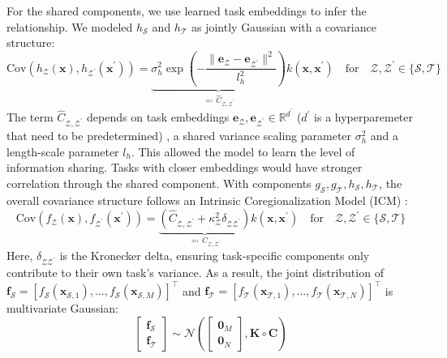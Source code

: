 \documentclass[preprint,12pt]{elsarticle}
\begin{document}
For the shared components, we use learned task embeddings to infer the relationship. We modeled $h_\mathcal{S}$ and $h_\mathcal{T}$ as jointly Gaussian with a covariance structure:
\begin{equation}
    \text{Cov}(h_{\mathcal Z}(\mathbf x),h_{\mathcal Z^\prime}(\mathbf x^\prime))= \underbrace{\sigma^2_h \exp\left(-\frac{\| \mathbf{e}_\mathcal{Z}-\mathbf{e}_{\mathcal{Z}^\prime}\|^2}{l_h^2}\right)}_{
    \eqqcolon\,\hat{C}_{\mathcal{Z},\mathcal{Z}^\prime} 
    }k(\mathbf x,\mathbf x^\prime) \quad \text{for}\quad \mathcal{Z,Z^\prime}\in\{\mathcal{S,T}\}
\end{equation}
The term $\hat{C}_{\mathcal{Z},\mathcal{Z}^\prime}$ depends on task embeddings $\mathbf{e}_\mathcal{Z}, \mathbf{e}_{\mathcal{Z}^\prime} \in \mathbb{R}^{d^\prime}$ ($d^\prime$ is a hyperparemeter that need to be predetermined) , a shared variance scaling parameter $\sigma^2_h$ and a length-scale parameter $l_h$. This allowed the model to learn the level of information sharing. Tasks with closer embeddings would have stronger correlation through the shared component. With components $g_\mathcal{S}, g_\mathcal{T}, h_\mathcal{S}, h_\mathcal{T}$, the overall covariance structure follows an Intrinsic Coregionalization Model (ICM) \citep{bonilla2007multi}:
\begin{equation}
    \text{Cov}(f_\mathcal{Z}(\mathbf{x}), f_{\mathcal{Z}^\prime}(\mathbf{x}^\prime)) = \underbrace{\left( \hat{C}_{\mathcal{Z},\mathcal{Z}^\prime} + \kappa^2_\mathcal{Z}\delta_{\mathcal{Z}\mathcal{Z}^\prime} \right)}_{\eqqcolon\, C_{\mathcal{Z},\mathcal{Z}^\prime}} k(\mathbf{x}, \mathbf{x}^\prime)\quad \text{for}\quad \mathcal{Z,Z^\prime}\in\{\mathcal{S,T}\}
\end{equation}
Here, $\delta_{\mathcal{Z}\mathcal{Z}^\prime}$ is the Kronecker delta, ensuring task-specific components only contribute to their own task's variance. As a result, the joint distribution of $\mathbf{f}_{\mathcal{S}}=[f_\mathcal{S}(\mathbf{x}_{\mathcal{S},1}),\dots,f_\mathcal{S}(\mathbf{x}_{\mathcal{S},M})]^\intercal$ and $\mathbf{f}_{\mathcal{T}}=[f_\mathcal{T}(\mathbf{x}_{\mathcal{T},1}),\dots,f_\mathcal{T}(\mathbf{x}_{\mathcal{T},N})]^\intercal$ is multivariate Gaussian:
\begin{equation}
\begin{bmatrix} \mathbf{f}_{\mathcal{S}} \\ \mathbf{f}_{\mathcal{T}}\end{bmatrix}
    \sim
    \mathcal{N}\left(\begin{bmatrix} \mathbf{0}_M \\ \mathbf{0}_N \end{bmatrix},
     \mathbf{K}\circ \mathbf{C} \right)
\end{equation}
\end{document}
